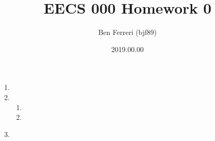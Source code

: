 \documentclass[12pt]{article}
\title{EECS 000 Homework 0}
\date{2019.00.00}
\author{Ben Ferreri (bjf89)}
\begin{document}
\maketitle

\begin{enumerate}
    
    \item
        
    \item
        \begin{enumerate}
            
            \item
                
            \item 
                
        \end{enumerate}

    \item

        \begin{minipage}[t]{\linewidth}
        \raggedright
        \medskip\\
        \end{minipage} 
        
\end{enumerate}
\end{document}
